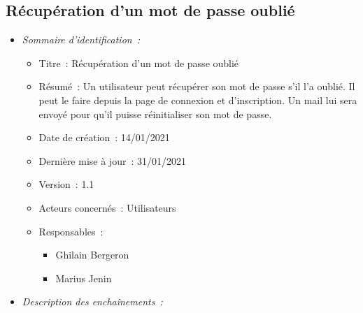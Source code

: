 \subsection{Récupération d'un mot de passe oublié}

\begin{itemize}

\item \textit{Sommaire d'identification~:}

    \begin{itemize}
    
    \item Titre~: Récupération d'un mot de passe oublié
    
    \item Résumé~: Un utilisateur peut récupérer son mot de passe s'il l'a oublié.
    Il peut le faire depuis la page de connexion et d'inscription. Un mail lui sera envoyé pour qu'il puisse réinitialiser son mot de passe.
    
    \item Date de création~: 14/01/2021
    
    \item Dernière mise à jour~: 31/01/2021
    
    \item Version~: 1.1
    
    \item Acteurs concernés~: Utilisateurs
    
    \item Responsables~:
    
        \begin{itemize}
            \item Ghilain Bergeron
            \item Marius Jenin
        \end{itemize}
    
    \end{itemize}

\item \textit{Description des enchaînements~:}


\end{itemize}
